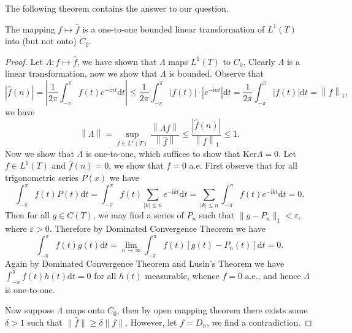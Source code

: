The following theorem contains the answer to our question.
\begin{theorem}
The mapping $f\mapsto\widehat{f}$ is a one-to-one bounded linear transformation of $L^1(T)$ into (but not onto) $C_0$.
\end{theorem}
\begin{proof}
Let $\Lambda:f\mapsto\widehat{f}$, we have shown that $\Lambda$ maps $L^1(T)$ to $C_0$. Clearly $\Lambda$ is a linear transformation, now we show that $\Lambda$ is bounded. Observe that 
$$
\left| \widehat{f}\left( n \right) \right|=\left| \frac{1}{2\pi}\int_{-\pi}^{\pi}{f\left( t \right) e^{-\mathrm{i}nt}\mathrm{d}t} \right|\le \frac{1}{2\pi}\int_{-\pi}^{\pi}{\left| f\left( t \right) \right|\cdot \left| e^{-\mathrm{i}nt} \right|\mathrm{d}t}=\frac{1}{2\pi}\int_{-\pi}^{\pi}{\left| f\left( t \right) \right|\mathrm{d}t}=\left\| f \right\| _1,
$$
we have 
$$
\left\| \Lambda \right\| =\mathop {\mathrm{sup}} \limits_{f\in L^1\left( T \right)}\frac{\left\| \Lambda f \right\|}{\left\| \widehat{f} \right\|}\le \frac{\left| \widehat{f}\left( n \right) \right|}{\left\| f \right\| _1}\le 1.
$$
Now we show that $\Lambda$ is one-to-one, which suffices to show that $\mathrm{Ker}\Lambda=0$. Let $f\in L^1(T)$ and $\widehat{f}(n)=0$, we show that $f=0$ a.e. First observe that for all trigonometric series $P(x)$ we have 
$$
\int_{-\pi}^{\pi}{f\left( t \right) P\left( t \right) \mathrm{d}t}=\int_{-\pi}^{\pi}{f\left( t \right) \sum_{\left| k \right|\le n}{e^{-\mathrm{i}kt}}\mathrm{d}t}=\sum_{\left| k \right|\le n}{\int_{-\pi}^{\pi}{f\left( t \right) e^{-\mathrm{i}kt}\mathrm{d}t}}=0.
$$
Then for all $g\in C(T)$, we may find a series of $P_n$ such that $\|g-P_n\|_1<\varepsilon$, where $\varepsilon>0$. Therefore by Dominated Convergence Theorem we have 
$$
\int_{-\pi}^{\pi}{f\left( t \right) g\left( t \right) \mathrm{d}t}=\lim_{n\rightarrow \infty} \int_{-\pi}^{\pi}{f\left( t \right) \left[ g\left( t \right) -P_n\left( t \right) \right] \mathrm{d}t}=0.
$$
Again by Dominated Convergence Theorem and Lusin's Theorem we have $\int_{-\pi}^\pi f(t)h(t)\mathrm{d}t=0$ for all $h(t)$ measurable, whence $f=0$ a.e., and hence $\Lambda$ is one-to-one.\par
Now suppose $\Lambda$ maps onto $C_0$, then by open mapping theorem there exists some $\delta>1$ such that $\|\widehat{f}\|\ge\delta\|f\|$. However, let $f=D_n$, we find a contradiction.
\end{proof}
